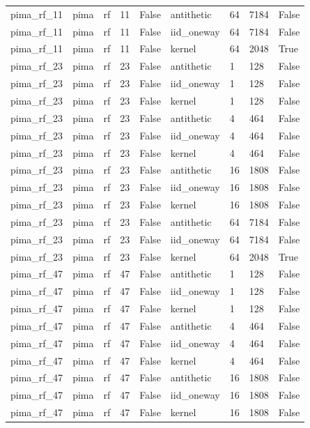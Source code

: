 \begin{tabular}{lllllllll}
pima\_rf\_11 & pima & rf & 11 & False & antithetic & 64 & 7184 & False \\
pima\_rf\_11 & pima & rf & 11 & False & iid\_oneway & 64 & 7184 & False \\
pima\_rf\_11 & pima & rf & 11 & False & kernel & 64 & 2048 & True \\
pima\_rf\_23 & pima & rf & 23 & False & antithetic & 1 & 128 & False \\
pima\_rf\_23 & pima & rf & 23 & False & iid\_oneway & 1 & 128 & False \\
pima\_rf\_23 & pima & rf & 23 & False & kernel & 1 & 128 & False \\
pima\_rf\_23 & pima & rf & 23 & False & antithetic & 4 & 464 & False \\
pima\_rf\_23 & pima & rf & 23 & False & iid\_oneway & 4 & 464 & False \\
pima\_rf\_23 & pima & rf & 23 & False & kernel & 4 & 464 & False \\
pima\_rf\_23 & pima & rf & 23 & False & antithetic & 16 & 1808 & False \\
pima\_rf\_23 & pima & rf & 23 & False & iid\_oneway & 16 & 1808 & False \\
pima\_rf\_23 & pima & rf & 23 & False & kernel & 16 & 1808 & False \\
pima\_rf\_23 & pima & rf & 23 & False & antithetic & 64 & 7184 & False \\
pima\_rf\_23 & pima & rf & 23 & False & iid\_oneway & 64 & 7184 & False \\
pima\_rf\_23 & pima & rf & 23 & False & kernel & 64 & 2048 & True \\
pima\_rf\_47 & pima & rf & 47 & False & antithetic & 1 & 128 & False \\
pima\_rf\_47 & pima & rf & 47 & False & iid\_oneway & 1 & 128 & False \\
pima\_rf\_47 & pima & rf & 47 & False & kernel & 1 & 128 & False \\
pima\_rf\_47 & pima & rf & 47 & False & antithetic & 4 & 464 & False \\
pima\_rf\_47 & pima & rf & 47 & False & iid\_oneway & 4 & 464 & False \\
pima\_rf\_47 & pima & rf & 47 & False & kernel & 4 & 464 & False \\
pima\_rf\_47 & pima & rf & 47 & False & antithetic & 16 & 1808 & False \\
pima\_rf\_47 & pima & rf & 47 & False & iid\_oneway & 16 & 1808 & False \\
pima\_rf\_47 & pima & rf & 47 & False & kernel & 16 & 1808 & False \\

\end{tabular}
